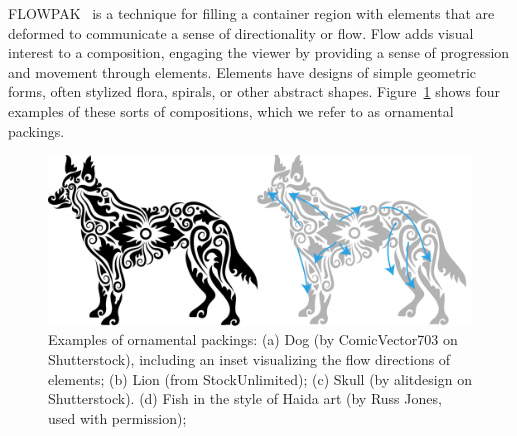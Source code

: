 \newtext
{
FLOWPAK~\cite{Saputra2017} is a technique for filling a container 
region with elements that are deformed 
to communicate a sense of directionality or flow.
Flow adds visual interest to a composition,
engaging the viewer by providing a sense of progression and
movement through elements.
Elements have designs of simple geometric forms, often stylized flora, spirals, or other abstract shapes. 
Figure~\ref{dog_flow} shows four examples of these sorts of compositions, which we refer to as ornamental packings.
}




\begin{figure}[t!] %
\centering
\includegraphics[width=1.0\textwidth]{figures/flowpak/dog_ornament_flow.pdf}
\caption[An example of flow visual style]{
  \label{dog_flow}  
\newtext
{
Examples of ornamental packings: 
(a) Dog (by ComicVector703 on Shutterstock), 
including an inset visualizing the flow directions of elements; 
(b) Lion (from StockUnlimited);  
(c) Skull (by alitdesign on Shutterstock).
(d) Fish in the style of Haida art (by Russ Jones, used with permission); 
}
}
\end{figure}


